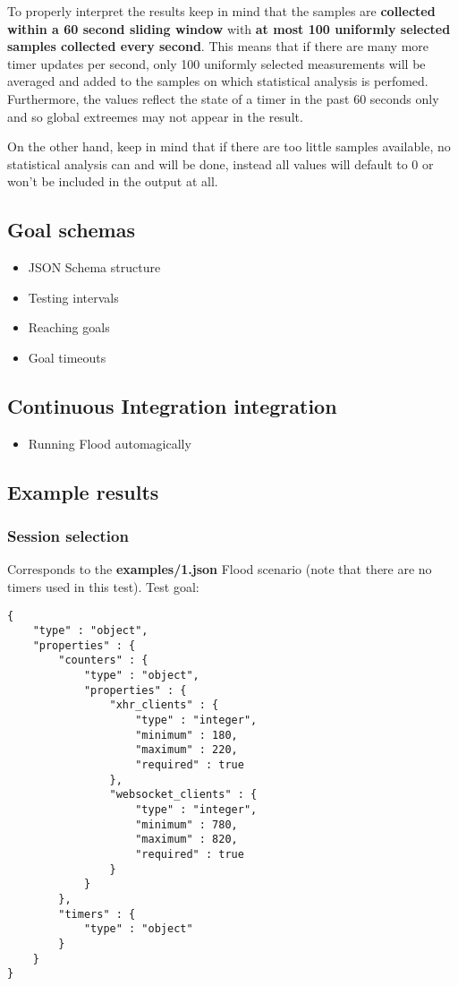 \documentclass[a4paper]{article}
\begin{document}
\noindent
To properly interpret the results keep in mind that the samples are \textbf{collected within a 60 second sliding window} with \textbf{at most 100 uniformly selected samples collected every second}. This means that if there are many more timer updates per second, only 100 uniformly selected measurements will be averaged and added to the samples on which statistical analysis is perfomed. Furthermore, the values reflect the state of a timer in the past 60 seconds only and so global extreemes may not appear in the result.

\noindent
On the other hand, keep in mind that if there are too little samples available, no statistical analysis can and will be done, instead all values will default to 0 or won't be included in the output at all.
\subsection{Goal schemas}
\label{sec-4-2}
\label{ref-goal_schemas}


\begin{itemize}
\item JSON Schema structure
\item Testing intervals
\item Reaching goals
\item Goal timeouts
\end{itemize}
\subsection{Continuous Integration integration}
\label{sec-4-3}


\begin{itemize}
\item Running Flood automagically
\end{itemize}
\subsection{Example results}
\label{sec-4-4}
\label{ref-example_results}
\subsubsection{Session selection}
\label{sec-4-4-1}

Corresponds to the \textbf{examples/1.json} Flood scenario (note that there are no timers used in this test). Test goal:


\begin{verbatim}
{
    "type" : "object",
    "properties" : {
        "counters" : {
            "type" : "object",
            "properties" : {
                "xhr_clients" : {
                    "type" : "integer",
                    "minimum" : 180,
                    "maximum" : 220,
                    "required" : true
                },
                "websocket_clients" : {
                    "type" : "integer",
                    "minimum" : 780,
                    "maximum" : 820,
                    "required" : true
                }
            }
        },
        "timers" : {
            "type" : "object"
        }
    }
}
\end{verbatim}
\end{document}
